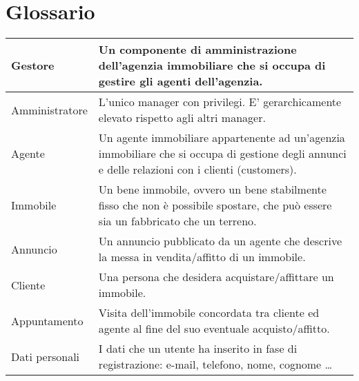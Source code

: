 \section{Glossario}
\begin{center}
\begin{tabular}{| m{8em} | m{8cm}|}
    \hline
    Gestore & Un componente di amministrazione dell'agenzia immobiliare 
    che si occupa di gestire gli agenti dell'agenzia. \\
    \hline
    Amministratore & L'unico manager con privilegi. E' gerarchicamente 
    elevato rispetto agli altri manager.
    \\
    \hline
    Agente & Un agente immobiliare appartenente ad un'agenzia immobiliare 
    che si occupa di gestione degli annunci e delle relazioni con i clienti (customers). \\
    \hline
    Immobile & Un bene immobile, ovvero un bene stabilmente fisso che non è 
    possibile spostare, che può essere sia un fabbricato che un terreno.\\
    \hline
    Annuncio & Un annuncio pubblicato da un agente che descrive la messa in 
    vendita/affitto di un immobile. \\
    \hline
    Cliente & Una persona che desidera acquistare/affittare un immobile.\\
    \hline
    Appuntamento & Visita dell'immobile concordata tra cliente ed agente al fine del 
    suo eventuale acquisto/affitto.\\
    \hline
    Dati personali & I dati che un utente ha inserito in fase di registrazione: 
    e-mail, telefono, nome, cognome \dots \\
    \hline

\end{tabular}
\end{center}